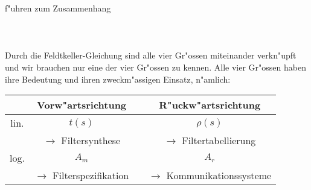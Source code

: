 \nit f"uhren zum Zusammenhang\\~~\\
\myboxx{\[
e^{-2 A_m} + e^{-2 A_r}=1.
\]}\\~~\\
\nit Durch die Feldtkeller-Gleichung sind alle vier Gr"ossen miteinander
verkn"upft und wir brauchen nur eine der vier Gr"ossen zu kennen.
Alle vier Gr"ossen haben ihre Bedeutung und ihren zweckm"assigen
Einsatz, n"amlich:\\
\begin{center}
\begin{tabular}{|c||cc|c|}\hline
& Vorw"artsrichtung & \hspace*{1cm} & R"uckw"artsrichtung \\ \hline\hline
lin. & $t(s)$ && $\rho(s)$\\
& $\rightarrow $ Filtersynthese && $\rightarrow $ Filtertabellierung \\\hline\hline
log. & $A_m$ && $A_r$ \\
& $\rightarrow $ Filterspezifikation && $\rightarrow $ Kommunikationssysteme \\ \hline
\end{tabular}
\end{center}
